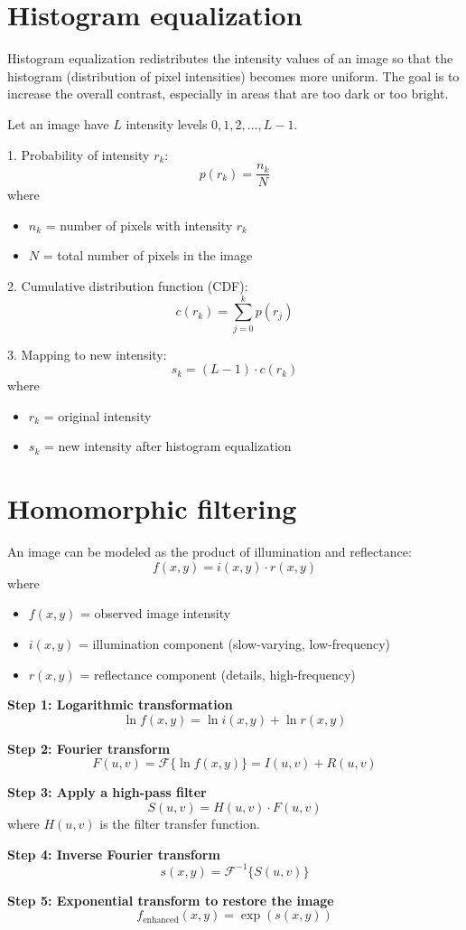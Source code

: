 \section{Histogram equalization}

Histogram equalization redistributes the intensity values of an image so that the histogram (distribution of pixel intensities) becomes more uniform. The goal is to increase the overall contrast, especially in areas that are too dark or too bright.

Let an image have $L$ intensity levels $0, 1, 2, \dots, L-1$.

1. Probability of intensity $r_k$:
\[
p(r_k) = \frac{n_k}{N}
\]
where 
\begin{itemize}
    \item $n_k$ = number of pixels with intensity $r_k$
    \item $N$ = total number of pixels in the image
\end{itemize}

2. Cumulative distribution function (CDF):
\[
c(r_k) = \sum_{j=0}^{k} p(r_j)
\]

3. Mapping to new intensity:
\[
s_k = (L-1) \cdot c(r_k)
\]
where 
\begin{itemize}
    \item $r_k$ = original intensity
    \item $s_k$ = new intensity after histogram equalization
\end{itemize}


\section{Homomorphic filtering}


An image can be modeled as the product of illumination and reflectance:
\[
f(x, y) = i(x, y) \cdot r(x, y)
\]
where
\begin{itemize}
    \item $f(x, y)$ = observed image intensity
    \item $i(x, y)$ = illumination component (slow-varying, low-frequency)
    \item $r(x, y)$ = reflectance component (details, high-frequency)
\end{itemize}

\textbf{Step 1: Logarithmic transformation}
\[
\ln f(x, y) = \ln i(x, y) + \ln r(x, y)
\]

\textbf{Step 2: Fourier transform}
\[
F(u, v) = \mathcal{F}\{\ln f(x, y)\} = I(u, v) + R(u, v)
\]

\textbf{Step 3: Apply a high-pass filter}
\[
S(u, v) = H(u, v) \cdot F(u, v)
\]
where $H(u,v)$ is the filter transfer function.

\textbf{Step 4: Inverse Fourier transform}
\[
s(x, y) = \mathcal{F}^{-1}\{S(u, v)\}
\]

\textbf{Step 5: Exponential transform to restore the image}
\[
f_{\text{enhanced}}(x, y) = \exp(s(x, y))
\]
